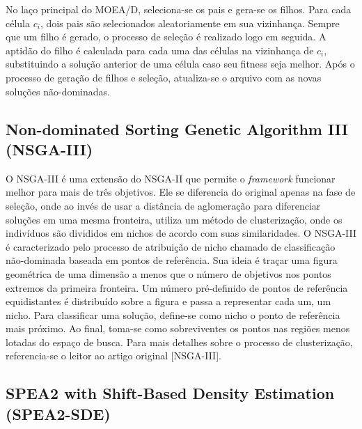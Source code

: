 No laço principal do MOEA/D, seleciona-se os pais e gera-se os filhos. Para cada célula $c_i$, dois pais são selecionados aleatoriamente em sua vizinhança. Sempre que um filho é gerado, o processo de seleção é realizado logo em seguida. A aptidão do filho é calculada para cada uma das células na vizinhança de $c_i$, substituindo a solução anterior de uma célula caso seu fitness seja melhor. Após o processo de geração de filhos e seleção, atualiza-se o arquivo com as novas soluções não-dominadas.

\subsection{Non-dominated Sorting Genetic Algorithm III (NSGA-III)}

O NSGA-III \cite{Deb2014} é uma extensão do NSGA-II que permite o \textit{framework} funcionar melhor para mais de três objetivos. Ele se diferencia do original apenas na fase de seleção, onde ao invés de usar a distância de aglomeração para diferenciar soluções em uma mesma fronteira, utiliza um método de clusterização, onde os indivíduos são divididos em nichos de acordo com suas similaridades. O NSGA-III é caracterizado pelo processo de atribuição de nicho chamado de classificação não-dominada baseada em pontos de referência. Sua ideia é traçar uma figura geométrica de uma dimensão a menos que o número de objetivos nos pontos extremos da primeira fronteira. Um número pré-definido de pontos de referência equidistantes é distribuído sobre a figura e passa a representar cada um, um nicho. Para classificar uma solução, define-se como nicho o ponto de referência mais próximo. Ao final, toma-se como sobreviventes os pontos nas regiões menos lotadas do espaço de busca. Para mais detalhes sobre o processo de clusterização, referencia-se o leitor ao artigo original [NSGA-III].

\subsection{SPEA2 with Shift-Based Density Estimation (SPEA2-SDE)}

